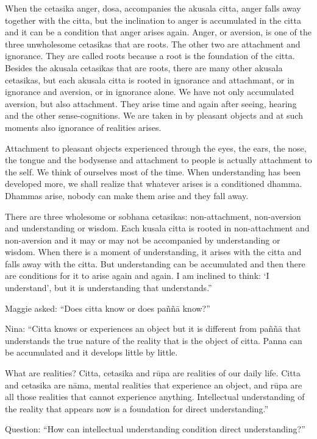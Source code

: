 When the cetasika anger, dosa, accompanies the akusala citta, anger falls away 
together with the citta, but the inclination to anger is accumulated in the citta 
and it can be a condition that anger arises again. Anger, or aversion, is one of 
the three unwholesome cetasikas that are roots. The other two are attachment 
and ignorance. They are called roots because a root is the foundation of the citta. Besides the akusala cetasikas that are roots, there are many other akusala 
cetasikas, but each akusala citta is rooted in ignorance and attachmant, or in ignorance and aversion, or in ignorance alone. We have not only accumulated 
aversion, but also attachment. They arise time and again after seeing, hearing 
and the other sense-cognitions. We are taken in by pleasant objects and at such 
moments also ignorance of realities arises. 

Attachment to pleasant objects experienced through the eyes, the ears, the nose, 
the tongue and the bodysense and attachment to people is actually attachment to 
the self. We think of ourselves most of the time. When understanding has been 
developed more, we shall realize that whatever arises is a conditioned dhamma. 
Dhammas arise, nobody can make them arise and they fall away. 

There are three wholesome or sobhana cetasikas: non-attachment, non-aversion 
and understanding or wisdom. Each kusala citta is rooted in non-attachment and 
non-aversion and it may or may not be accompanied by understanding or wisdom. 
When there is a moment of understanding, it arises with the citta and falls 
away with the citta. But understanding can be accumulated and then there are 
conditions for it to arise again and again. I am inclined to think: `I understand', 
but it is understanding that understands.” 

Maggie asked: ``Does citta know or does paññā know?'' 

Nina: ``Citta knows or experiences an object but it is different from paññā that 
understands the true nature of the reality that is the object of citta. Panna can be 
accumulated and it develops little by little. 

What are realities? Citta, cetasika and rūpa are realities of our daily life. Citta 
and cetasika are nāma, mental realities that experience an object, and rūpa are 
all those realities that cannot experience anything. Intellectual understanding of 
the reality that appears now is a foundation for direct understanding.'' 

Question: ``How can intellectual understanding condition direct understanding?'' 


